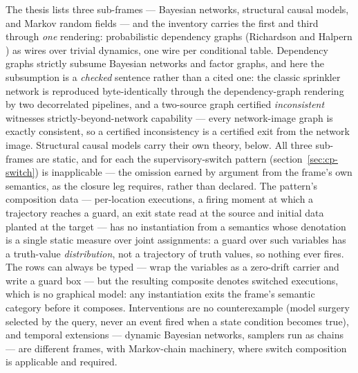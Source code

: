 The thesis lists three sub-frames --- Bayesian networks, structural
causal models, and Markov random fields --- and the inventory carries
the first and third through \emph{one} rendering: probabilistic
dependency graphs
(Richardson and Halpern \cite{richardson20}) as wires over trivial dynamics, one wire per conditional
table. Dependency graphs strictly subsume Bayesian networks and
factor graphs, and here the subsumption is a \emph{checked} sentence
rather than a cited one: the classic sprinkler network is reproduced
byte-identically through the dependency-graph rendering by two
decorrelated pipelines, and a two-source graph certified
\emph{inconsistent} witnesses strictly-beyond-network capability ---
every network-image graph is exactly consistent, so a certified
inconsistency is a certified exit from the network image. Structural
causal models carry their own theory, below. All three sub-frames
are static, and for each the supervisory-switch pattern
(section~\ref{sec:cp-switch}) is inapplicable --- the omission earned
by argument from the frame's own semantics, as the closure leg
requires, rather than declared. The pattern's composition data ---
per-location executions, a firing moment at which a trajectory
reaches a guard, an exit state read at the source and initial data
planted at the target --- has no instantiation from a semantics whose
denotation is a single static measure over joint assignments: a guard
over such variables has a truth-value \emph{distribution}, not a
trajectory of truth values, so nothing ever fires. The rows can
always be typed --- wrap the variables as a zero-drift carrier and
write a guard box --- but the resulting composite denotes switched
executions, which is no graphical model: any instantiation exits the
frame's semantic category before it composes. Interventions are no
counterexample (model surgery selected by the query, never an event
fired when a state condition becomes true), and temporal
extensions --- dynamic Bayesian networks, samplers run as chains ---
are different frames, with Markov-chain machinery, where switch
composition is applicable and required.



